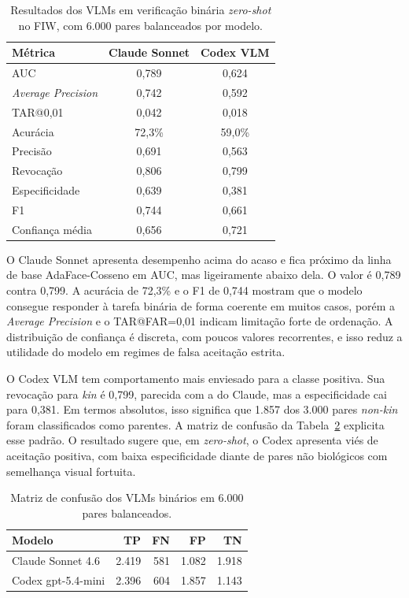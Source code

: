 \begin{table}[htbp]
\centering
\caption{Resultados dos VLMs em verificação binária \textit{zero-shot} no FIW, com 6.000 pares balanceados por modelo.}
\label{tab:vlm_binario_resultados}
\begin{tabularx}{0.82\textwidth}{Xcc}
\hline
\textbf{Métrica} & \textbf{Claude Sonnet} & \textbf{Codex VLM} \\
\hline
AUC & 0{,}789 & 0{,}624 \\
\textit{Average Precision} & 0{,}742 & 0{,}592 \\
TAR@0{,}01 & 0{,}042 & 0{,}018 \\
Acurácia & 72{,}3\% & 59{,}0\% \\
Precisão & 0{,}691 & 0{,}563 \\
Revocação & 0{,}806 & 0{,}799 \\
Especificidade & 0{,}639 & 0{,}381 \\
F1 & 0{,}744 & 0{,}661 \\
Confiança média & 0{,}656 & 0{,}721 \\
\hline
\end{tabularx}
\end{table}

O Claude Sonnet apresenta desempenho acima do acaso e fica próximo da linha de base AdaFace-Cosseno em AUC, mas ligeiramente abaixo dela. O valor é 0,789 contra 0,799. A acurácia de 72,3\% e o F1 de 0,744 mostram que o modelo consegue responder à tarefa binária de forma coerente em muitos casos, porém a \textit{Average Precision} e o TAR@FAR=0{,}01 indicam limitação forte de ordenação. A distribuição de confiança é discreta, com poucos valores recorrentes, e isso reduz a utilidade do modelo em regimes de falsa aceitação estrita.

O Codex VLM tem comportamento mais enviesado para a classe positiva. Sua revocação para \textit{kin} é 0,799, parecida com a do Claude, mas a especificidade cai para 0,381. Em termos absolutos, isso significa que 1.857 dos 3.000 pares \textit{non-kin} foram classificados como parentes. A matriz de confusão da Tabela~\ref{tab:vlm_confusao_binaria} explicita esse padrão. O resultado sugere que, em \textit{zero-shot}, o Codex apresenta viés de aceitação positiva, com baixa especificidade diante de pares não biológicos com semelhança visual fortuita.

\begin{table}[htbp]
\centering
\small
\setlength{\tabcolsep}{5pt}
\caption{Matriz de confusão dos VLMs binários em 6.000 pares balanceados.}
\label{tab:vlm_confusao_binaria}
\begin{tabular}{lrrrr}
\hline
\textbf{Modelo} & \textbf{TP} & \textbf{FN} & \textbf{FP} & \textbf{TN} \\
\hline
Claude Sonnet 4.6 & 2.419 & 581 & 1.082 & 1.918 \\
Codex gpt-5.4-mini & 2.396 & 604 & 1.857 & 1.143 \\
\hline
\end{tabular}
\end{table}

